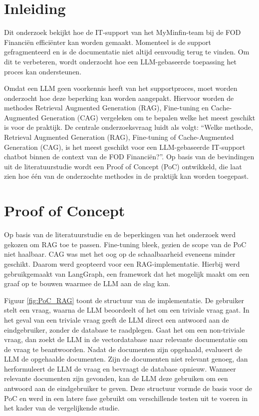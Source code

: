 \documentclass[a0,portrait]{hogent-poster}
\begin{document}
\begin{multicols}{2} %

\section{Inleiding}

Dit onderzoek bekijkt hoe de IT-support van het MyMinfin-team bij de FOD Financiën efficiënter kan worden gemaakt. Momenteel is de support gefragmenteerd en is de documentatie niet altijd eenvoudig terug te vinden. Om dit te verbeteren, wordt onderzocht hoe een LLM-gebaseerde toepassing het proces kan ondersteunen.

Omdat een LLM geen voorkennis heeft van het supportproces, moet worden onderzocht hoe deze beperking kan worden aangepakt. Hiervoor worden de methodes Retrieval Augmented Generation (RAG), Fine-tuning en Cache-Augmented Generation (CAG) vergeleken om te bepalen welke het meest geschikt is voor de praktijk. De centrale onderzoeksvraag luidt als volgt: “Welke methode, Retrieval Augmented Generation (RAG), Fine-tuning of Cache-Augmented Generation (CAG), is het meest geschikt voor een LLM-gebaseerde IT-support chatbot binnen de context van de FOD Financiën?”. Op basis van de bevindingen uit de literatuurstudie wordt een Proof of Concept (PoC) ontwikkeld, die laat zien hoe één van de onderzochte methodes in de praktijk kan worden toegepast.

\section{Proof of Concept}

Op basis van de literatuurstudie en de beperkingen van het onderzoek werd gekozen om RAG toe te passen. Fine-tuning bleek, gezien de scope van de PoC niet haalbaar. CAG was met het oog op de schaalbaarheid eveneens minder geschikt. Daarom werd geopteerd voor een RAG-implementatie. Hierbij werd gebruikgemaakt van LangGraph, een framework dat het mogelijk maakt om een graaf op te bouwen waarmee de LLM aan de slag kan.

Figuur \ref{fig:PoC_RAG} toont de structuur van de implementatie. De gebruiker stelt een vraag, waarna de LLM beoordeelt of het om een triviale vraag gaat. In het geval van een triviale vraag geeft de LLM direct een antwoord aan de eindgebruiker, zonder de database te raadplegen. Gaat het om een non-triviale vraag, dan zoekt de LLM in de vectordatabase naar relevante documentatie om de vraag te beantwoorden. Nadat de documenten zijn opgehaald, evalueert de LLM de opgehaalde documenten. Zijn de documenten niet relevant genoeg, dan herformuleert de LLM de vraag en bevraagt de database opnieuw. Wanneer relevante documenten zijn gevonden, kan de LLM deze gebruiken om een antwoord aan de eindgebruiker te geven. Deze structuur vormde de basis voor de PoC en werd in een latere fase gebruikt om verschillende testen uit te voeren in het kader van de vergelijkende studie.


\end{multicols}
\end{document}
